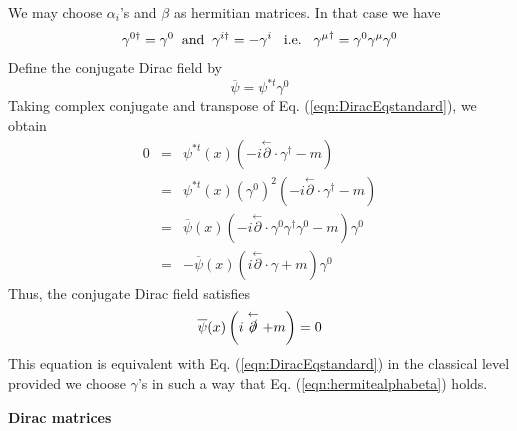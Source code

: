 We may choose $\alpha_i$'s and $\beta$ as hermitian matrices.
In that case we have
\begin{eqnarray}
\gamma^{0\dagger} = \gamma^0
\hspace{2mm}
\mbox{and}
\hspace{2mm}
\gamma^{i\dagger} = - \gamma^i
\hspace{3mm}
\mbox{i.e.}
\hspace{3mm}
{\gamma^\mu}^\dagger = \gamma^0 \gamma^\mu \gamma^0
\label{eqn:hermitealphabeta}
\end{eqnarray}
Define the conjugate Dirac field by
\begin{equation}
\overline{\psi} = \psi^{*t} \gamma^0
\label{eqn:DefConjDiracField}
\end{equation}
Taking complex conjugate and transpose of Eq. (\ref{eqn:DiracEqstandard}), we obtain
\begin{eqnarray}
0 &=&  
\psi^{*t}(x) 
\left( -i \stackrel{\leftarrow}{\partial} \cdot \gamma^\dagger - m \right) 
\nonumber\\
&=&
\psi^{*t}(x) (\gamma^0)^2
\left( -i \stackrel{\leftarrow}{\partial} \cdot \gamma^\dagger - m \right) 
\nonumber\\
&=&
\overline{\psi}(x)
\left( -i \stackrel{\leftarrow}{\partial} \cdot \gamma^0\gamma^\dagger \gamma^0 - m \right) \gamma^0
\nonumber\\
&=&
- \overline{\psi}(x)
\left( i \stackrel{\leftarrow}{\partial} \cdot \gamma  + m \right) \gamma^0
\nonumber
\end{eqnarray}
Thus, the conjugate Dirac field satisfies
\begin{eqnarray}
\overline{\psi}(x)
\left( i \stackrel{\leftarrow}{\slashed{\partial}}  + m \right)
= 0
\label{eqn:DiracEqConjstandard}
\end{eqnarray}
This equation is equivalent with Eq. (\ref{eqn:DiracEqstandard}) in the classical level
provided we choose $\gamma$'s in such a way that Eq. (\ref{eqn:hermitealphabeta}) holds.

\bigskip
\noindent
{\bf Dirac matrices}

